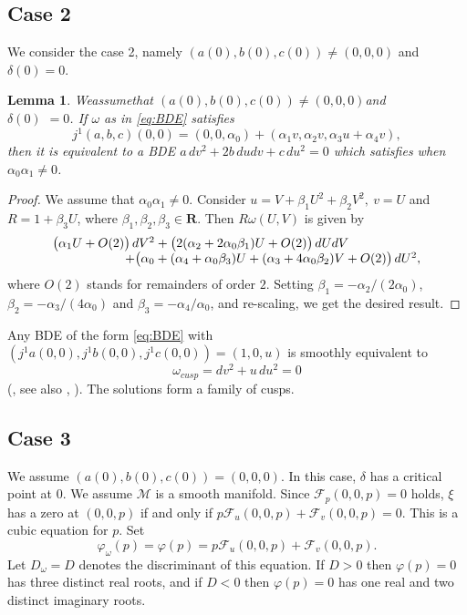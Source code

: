 \documentclass[a4paper, 12pt]{article}
\newtheorem{lemma}[theorem]{Lemma}
\theoremstyle{definition}
\numberwithin{equation}{section}
\begin{document}
\subsection{Case 2}\label{sec:case2}
We consider the case 2, namely 
$(a(0),b(0),c(0))\ne(0,0,0)$ and $\delta(0)=0$.
\begin{lemma}\hfill 
We\hfill  assume\hfill  that\hfill 
$(a(0),b(0),c(0))\ne(0,0,0)$\hfill  and\\ $\delta(0)$ $=0$.
If\/ $\omega$ as in\/ \eqref{eq:BDE} satisfies
$$
j^1(a,b,c)(0,0)=(0,0,\alpha_0)
+(\alpha_1v,\alpha_2v, \alpha_3u+\alpha_4 v),
$$
then it 
is equivalent to
a  BDE\/ $a\,dv^2+2b\,dudv+c\,du^2=0$
which satisfies\/ 
{\ifx\TOUKOU{}\fi}
when\/ $\alpha_0\alpha_1\ne0$.
\end{lemma}
\begin{proof}
We assume that $\alpha_0\alpha_1\ne0$.
Consider $u=V+\beta_1U^2+\beta_2V^2,\ v=U$
and $R=1+\beta_3 U$, where $\beta_1,\beta_2,\beta_3\in{\boldsymbol{R}}$.
Then $R\omega(U,V)$ is given by
$$
\begin{array}{l}
\big(
\alpha_1U+O(2)\big)\,dV^2
+
\big(2(\alpha_2+2\alpha_0\beta_1)U+O(2)\big)\,dUdV\\
\hspace{20mm}
+\big(\alpha_0+(\alpha_4+\alpha_0 \beta_3)U+
(\alpha_3+4\alpha_0 \beta_2)V+O(2)
\big)\,dU^2,
\end{array}
$$
where $O(2)$ stands for remainders of order $2$.
Setting 
$\beta_1=-\alpha_2/(2\alpha_0)$, 
$\beta_2=-\alpha_3/(4\alpha_0)$ and
$\beta_3=-\alpha_4/\alpha_0$,
and re-scaling,
we get the desired result.
\end{proof}
Any BDE of the form \eqref{eq:BDE} 
with $(j^1a(0,0),j^1b(0,0),j^1c(0,0))=
(1,0,u)$ is smoothly equivalent to
\begin{equation}\label{eq:BDEcusp}
\omega_{cusp}=dv^2+u\,du^2=0
\end{equation}
(\cite{dara}, see also \cite[Section 4.2]{BTimplicit}, 
\cite[Proposition 3.3-2]{faridsurvey}).
The solutions form a family of cusps.
\subsection{Case 3}\label{sec:case3}
We assume $(a(0),b(0),c(0))=(0,0,0)$.
In this case, $\delta$ has a critical point at $0$.
We assume ${\mathcal{M}}$ is a smooth manifold.
Since ${\mathcal{F}}_p(0,0,p)=0$ holds,
$\xi$ has a zero at $(0,0,p)$ 
if and only if $p{\mathcal{F}}_u(0,0,p)+{\mathcal{F}}_v(0,0,p)=0$.
This is a cubic equation for $p$.
Set 
\begin{equation}\label{eq:defphi}
{\varphi}_\omega(p)={\varphi}(p)=p{\mathcal{F}}_u(0,0,p)+{\mathcal{F}}_v(0,0,p).
\end{equation}
Let $D_{\omega}=D$ denotes the discriminant of this equation.
If $D>0$ then ${\varphi}(p)=0$ has three distinct real roots,
and if $D<0$ then ${\varphi}(p)=0$ has one real and
two distinct imaginary roots.
\end{document}
